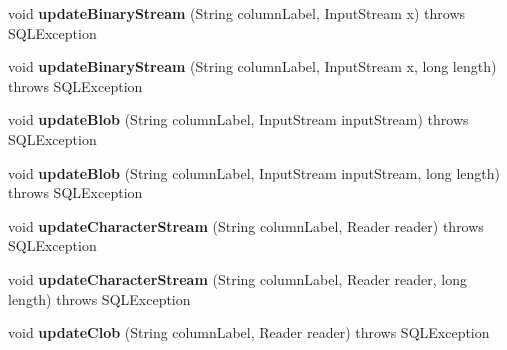 \begin{DoxyCompactItemize}
\mbox{\label{classcom_1_1mysql_1_1jdbc_1_1_j_d_b_c4_updatable_result_set_a8555952c8288e21890f77ed033d57d8d}} 
void {\bfseries update\+Binary\+Stream} (String column\+Label, Input\+Stream x)  throws S\+Q\+L\+Exception 
\item 
\mbox{\label{classcom_1_1mysql_1_1jdbc_1_1_j_d_b_c4_updatable_result_set_a96aad643a6cbc169bb461a6c851df0a6}} 
void {\bfseries update\+Binary\+Stream} (String column\+Label, Input\+Stream x, long length)  throws S\+Q\+L\+Exception 
\item 
\mbox{\label{classcom_1_1mysql_1_1jdbc_1_1_j_d_b_c4_updatable_result_set_aba235d92865cfbcb292da9cf117f5aa6}} 
void {\bfseries update\+Blob} (String column\+Label, Input\+Stream input\+Stream)  throws S\+Q\+L\+Exception 
\item 
\mbox{\label{classcom_1_1mysql_1_1jdbc_1_1_j_d_b_c4_updatable_result_set_a6203b44bc231cce6cdd405bab50fde83}} 
void {\bfseries update\+Blob} (String column\+Label, Input\+Stream input\+Stream, long length)  throws S\+Q\+L\+Exception 
\item 
\mbox{\label{classcom_1_1mysql_1_1jdbc_1_1_j_d_b_c4_updatable_result_set_a9b85d10add9a71e387a3e6480dea01a5}} 
void {\bfseries update\+Character\+Stream} (String column\+Label, Reader reader)  throws S\+Q\+L\+Exception 
\item 
\mbox{\label{classcom_1_1mysql_1_1jdbc_1_1_j_d_b_c4_updatable_result_set_aac6fcf70bdcb2f0bab51708cd2a0d0a6}} 
void {\bfseries update\+Character\+Stream} (String column\+Label, Reader reader, long length)  throws S\+Q\+L\+Exception 
\item 
\mbox{\label{classcom_1_1mysql_1_1jdbc_1_1_j_d_b_c4_updatable_result_set_a72dce2c53d673980e7f7d3e2cffead58}} 
void {\bfseries update\+Clob} (String column\+Label, Reader reader)  throws S\+Q\+L\+Exception 
\item 

\end{DoxyCompactItemize}
